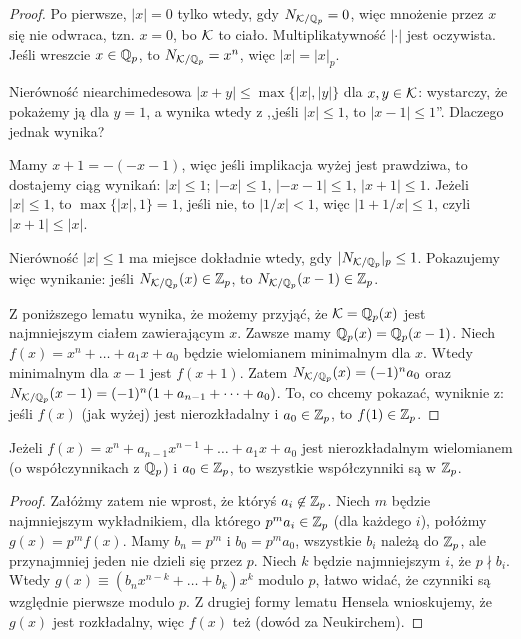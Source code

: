 \begin{proof}
	Po pierwsze, $|x| = 0$ tylko wtedy, gdy $N_{\mathcal K / \mathbb Q_p} = 0$, więc mnożenie przez $x$ się nie odwraca, tzn. $x = 0$, bo $\mathcal K$ to ciało.
	Multiplikatywność $|\cdot |$ jest oczywista.
	Jeśli wreszcie $ x \in \mathbb Q_p$, to $N_{\mathcal K/\mathbb Q_p} = x^n$, więc $|x| = |x|_p$.

	Nierówność niearchimedesowa $|x+y| \le \max\{|x|, |y|\}$ dla $x, y \in \mathcal K$: wystarczy, że pokażemy ją dla $y = 1$, a wynika wtedy z ,,jeśli $|x| \le 1$, to $|x-1| \le 1$''.
	Dlaczego jednak wynika?

	Mamy $x + 1 = -(-x-1)$, więc jeśli implikacja wyżej jest prawdziwa, to dostajemy ciąg wynikań: $|x| \le 1$; $|{-x}| \le 1$, $|{-x}-1| \le 1$, $|x+1| \le 1$.
	Jeżeli $|x| \le 1$, to $\max\{|x|, 1\} = 1$, jeśli nie, to $|1/x| < 1$, więc $|1+1/x| \le 1$, czyli $|x+1| \le |x|$.

	Nierówność $|x| \le 1$ ma miejsce dokładnie wtedy, gdy $|N_{\mathcal K / \mathbb Q_p}|_p \le 1$.
	Pokazujemy więc wynikanie: jeśli $N_{\mathcal K/\mathbb Q_p}(x) \in \mathbb Z_p$, to $N_{\mathcal K/\mathbb Q_p}(x-1) \in \mathbb Z_p$.

	Z poniższego lematu wynika, że możemy przyjąć, że $\mathcal K = \mathbb Q_p(x)$ jest najmniejszym ciałem zawierającym $x$.
	Zawsze mamy $\mathbb Q_p(x) = \mathbb Q_p(x-1)$.
	Niech $f(x) = x^n + \ldots + a_1 x + a_0$ będzie wielomianem minimalnym dla $x$.
	Wtedy minimalnym dla $x-1$ jest $f(x+1)$.
	Zatem $N_{\mathcal K/\mathbb Q_p}(x) = (-1)^n a_0$ oraz $N_{\mathcal K/\mathbb Q_p}(x-1) = (-1)^n(1 + a_{n-1} + \dots + a_0)$.
	To, co chcemy pokazać, wyniknie z: jeśli $f(x)$ (jak wyżej) jest nierozkładalny i $a_0 \in \mathbb Z_p$, to $f(1) \in \mathbb Z_p$.
\end{proof}

\begin{lemat}
	Jeżeli $f(x) = x^n + a_{n-1}x^{n-1} + \dots + a_1x  + a_0$ jest nierozkładalnym wielomianem (o współczynnikach z $\mathbb Q_p$) i $a_0 \in \mathbb Z_p$, to wszystkie współczynniki są w $\mathbb Z_p$.
\end{lemat}

\begin{proof}
	Załóżmy zatem nie wprost, że któryś $a_i \not \in \mathbb Z_p$.
	Niech $m$ będzie najmniejszym wykładnikiem, dla którego $p^ma_i \in \mathbb Z_p$ (dla każdego $i$), połóżmy $g(x) = p^mf(x)$.
	Mamy $b_n = p^m$ i $b_0 = p^m a_0$, wszystkie $b_i$ należą do $\mathbb Z_p$, ale przynajmniej jeden nie dzieli się przez $p$.
	Niech $k$ będzie najmniejszym $i$, że $p \nmid b_i$.
	Wtedy $g(x) \equiv (b_nx^{n-k} + \dots + b_k) x^k$ modulo $p$, łatwo widać, że czynniki są względnie pierwsze modulo $p$.
	Z drugiej formy lematu Hensela wnioskujemy, że $g(x)$ jest rozkładalny, więc $f(x)$ też (dowód za Neukirchem).
\end{proof}

